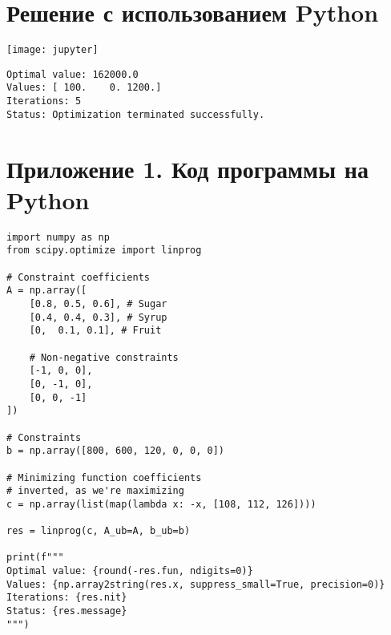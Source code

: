 \section{Решение с использованием Python}
\texttt{[image: jupyter]}

\newpage

\begin{verbatim}
Optimal value: 162000.0
Values: [ 100.    0. 1200.]
Iterations: 5
Status: Optimization terminated successfully.
\end{verbatim}

\section{Приложение 1. Код программы на Python}
\begin{verbatim}
import numpy as np
from scipy.optimize import linprog

# Constraint coefficients
A = np.array([
    [0.8, 0.5, 0.6], # Sugar
    [0.4, 0.4, 0.3], # Syrup
    [0,  0.1, 0.1], # Fruit

    # Non-negative constraints
    [-1, 0, 0],
    [0, -1, 0],
    [0, 0, -1]
])

# Constraints
b = np.array([800, 600, 120, 0, 0, 0])

# Minimizing function coefficients
# inverted, as we're maximizing
c = np.array(list(map(lambda x: -x, [108, 112, 126])))

res = linprog(c, A_ub=A, b_ub=b)

print(f"""
Optimal value: {round(-res.fun, ndigits=0)}
Values: {np.array2string(res.x, suppress_small=True, precision=0)}
Iterations: {res.nit}
Status: {res.message}
""")
\end{verbatim}
